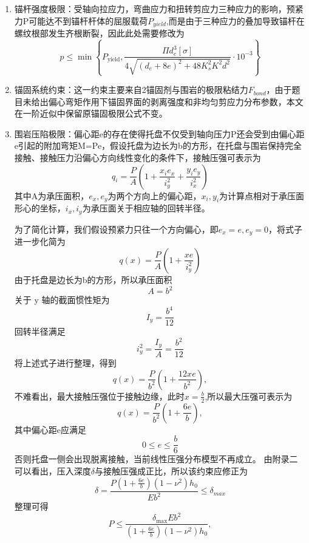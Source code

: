 \documentclass[UTF-8,a4paper,zihao=-4]{ctexart}
\begin{document}
\begin{enumerate}
    \item 锚杆强度极限：受轴向拉应力，弯曲应力和扭转剪应力三种应力的影响，预紧力P可能达不到锚杆杆体的屈服载荷$P_{yield}$,而是由于三种应力的叠加导致锚杆在螺纹根部发生齐根断裂，因此此处需要修改为
    \begin{equation}
        p\le \min
    \left\{
    P_{\mathrm{yield}},
    \frac{\Pi d_e^3[\sigma]}{4\sqrt{(d_e+8e)^2+48K_s^2K^2d^2}} \cdot 10^{-3}
    \right\}
    \end{equation}
    \item 锚固系统约束：这一约束主要来自2锚固剂与围岩的极限粘结力$F_{bond}$，由于题目未给出偏心弯矩作用下锚固界面的剥离强度和非均匀剪应力分布参数，本文在一阶近似中保留原锚固极限公式不变。
    \item 围岩压陷极限：偏心距e的存在使得托盘不仅受到轴向压力P还会受到由偏心距e引起的附加弯矩M=Pe，假设托盘为边长为b的方形，在托盘与围岩保持完全接触、接触压力沿偏心方向线性变化的条件下，接触压强可表示为\cite{ivan2010eccentric}
    \begin{equation}
        q_i
    =
    \frac{P}{A}
    \left(
        1+
        \frac{x_i e_x}{i_y^2}
        +
        \frac{y_i e_y}{i_x^2}
    \right)
    \end{equation}
    其中A为承压面积，$e_x,e_y$为两个方向上的偏心距，$x_i,y_i$为计算点相对于承压面形心的坐标，$i_x,i_y$为承压面关于相应轴的回转半径。

    为了简化计算，我们假设预紧力只往一个方向偏心，即$e_x=e,e_y=0$，将式子进一步化简为
    \begin{equation}
        q(x)
    =
    \frac{P}{A}
    \left(
        1+
        \frac{x e}{i_y^2}
    \right)
    \end{equation}
    由于托盘是边长为b的方形，所以承压面积\[A=b^2\]关于 y 轴的截面惯性矩为\[I_y=\frac{b^4}{12}\]回转半径满足\[i_y^2=\frac{I_y}{A}=\frac{b^2}{12}\]
    将上述式子进行整理，得到
    \begin{equation}
        q(x)
    =
    \frac{P}{b^2}
    \left(
        1+
        \frac{12x e}{b^2}
    \right),
    \end{equation}
    不难看出，最大接触压强位于接触边缘，此时$x=\frac{b}{2}$,所以最大压强可表示为
    \begin{equation}
        q(x)
    =
    \frac{P}{b^2}
    \left(
        1+
        \frac{6e}{b}
    \right),
    \end{equation}
    其中偏心距e应满足\[0\le e\le \frac{b}{6}\]否则托盘一侧会出现脱离接触，当前线性压强分布模型不再成立。
    由附录二可以看出，压入深度$\delta$与接触压强成正比，所以该约束应修正为
    \begin{equation}
        \delta=\frac{P(1+\frac{6e}{b})(1-\nu^2)h_0}{Eb^2}\le \delta_{max}
    \end{equation}
    整理可得
    \begin{equation}
        P\le\frac{\delta_{\max}Eb^2}{(1+\frac{6e}{b})(1-\nu^2)h_0},
    \end{equation}
    
\end{enumerate}
\end{document}
